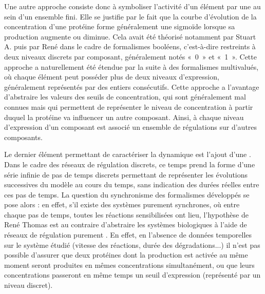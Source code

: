 Une autre approche consiste donc à symboliser l'activité d'un élément par
une  au sein d'un ensemble fini.
Elle se justifie par le fait que la courbe d'évolution de la concentration
d'une protéine forme généralement une sigmoïde lorsque sa production augmente ou diminue.
Cela avait été théorisé notamment par Stuart A. 
puis par René 
dans le cadre de formalismes booléens,
c'est-à-dire restreints à deux niveaux discrets par composant, généralement notés
«~0~» et «~1~».
Cette approche a naturellement été étendue par la suite à des formalismes multivalués,
où chaque élément peut posséder plus de deux niveaux d'expression,
généralement représentés par des entiers consécutifs.
Cette approche a l'avantage d'abstraire les valeurs des seuils de concentration,
qui sont généralement mal connues
mais qui permettent de représenter le niveau de concentration
à partir duquel la protéine va influencer un autre composant.
Ainsi, à chaque niveau d'expression d'un composant est associé un ensemble de régulations
sur d'autres composants.

Le dernier élément permettant de caractériser la dynamique est l'ajout d'une
.
Dans le cadre des réseaux de régulation discrets, ce temps prend la forme d'une série
infinie de pas de temps discrets permettant de représenter les évolutions
successives du modèle au cours du temps, sans indication des durées réelles
entre ces pas de temps.
La question du synchronisme des formalismes développés se pose alors :
en effet, s'il existe des systèmes purement synchrones, où entre chaque pas de temps,
toutes les réactions sensibilisées ont lieu,
l'hypothèse de René Thomas \cite{Thomas73}
est au contraire d'abstraire les systèmes biologiques à l'aide
de réseaux de régulation purement .
En effet, en l'absence de données temporelles sur le système étudié
(vitesse des réactions, durée des dégradations...)
il n'est pas possible d'assurer que deux protéines dont la production est activée au même moment
seront produites en mêmes concentrations simultanément,
ou que leurs concentrations passeront en même temps
un seuil d'expression (représenté par un niveau discret).

